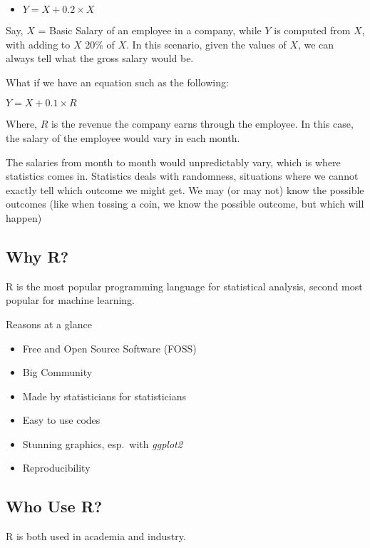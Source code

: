 \documentclass[
]{book}
\providecommand{\tightlist}{%
  \setlength{\itemsep}{0pt}\setlength{\parskip}{0pt}}
\begin{document}
\begin{itemize}
\tightlist
\item
  \(Y = X + 0.2 \times X\)
\end{itemize}

Say, \(X\) = Basic Salary of an employee in a company, while \(Y\) is computed from \(X\), with adding to \(X\) 20\% of \(X\). In this scenario, given the values of \(X\), we can always tell what the gross salary would be.

What if we have an equation such as the following:

\(Y = X + 0.1 \times R\)

Where, \(R\) is the revenue the company earns through the employee. In this case, the salary of the employee would vary in each month.

The salaries from month to month would unpredictably vary, which is where statistics comes in. Statistics deals with randomness, situations where we cannot exactly tell which outcome we might get. We may (or may not) know the possible outcomes (like when tossing a coin, we know the possible outcome, but which will happen)

\hypertarget{why-r}{%
\subsection{Why R?}\label{why-r}}

R is the most popular programming language for statistical analysis, second most popular for machine learning.

Reasons at a glance

\begin{itemize}
\tightlist
\item
  Free and Open Source Software (FOSS)
\item
  Big Community
\item
  Made by statisticians for statisticians
\item
  Easy to use codes
\item
  Stunning graphics, esp.~with \emph{ggplot2}
\item
  Reproducibility
\end{itemize}

\hypertarget{who-use-r}{%
\subsection{Who Use R?}\label{who-use-r}}

R is both used in academia and industry.
\end{document}
